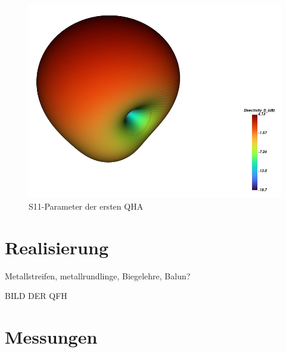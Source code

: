 \begin{figure} [H]
	\centering
	\includegraphics[width=\linewidth]{../ref/radiation_pattern_old_qfh.png}
	\caption{S11-Parameter der ersten QHA}
	\label{fig:rp_old_qha}
\end{figure}

\section{Realisierung}
Metallstreifen, metallrundlinge, Biegelehre, Balun?

BILD DER QFH

\section{Messungen}

